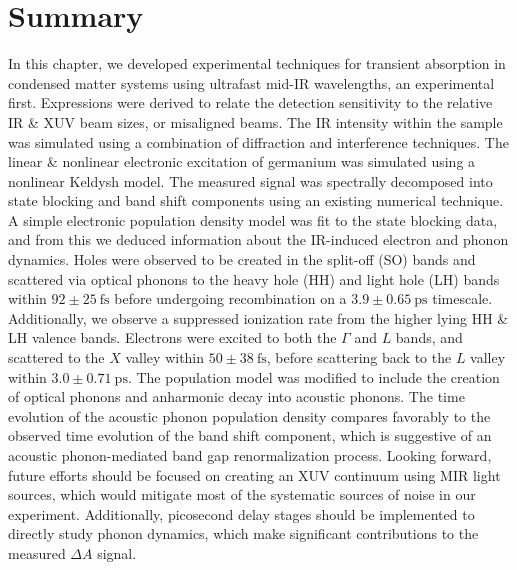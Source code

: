 \section{Summary}


In this chapter, we developed experimental techniques for transient absorption in condensed matter systems using ultrafast mid-IR wavelengths, an experimental first. Expressions were derived to relate the detection sensitivity to the relative IR \& XUV beam sizes, or misaligned beams. The IR intensity within the sample was simulated using a combination of diffraction and interference techniques. The linear \& nonlinear electronic excitation of germanium was simulated using a nonlinear Keldysh model. The measured signal was spectrally decomposed into state blocking and band shift components using an existing numerical technique. A simple electronic population density model was fit to the state blocking data, and from this we deduced information about the IR-induced electron and phonon dynamics. Holes were observed to be created in the split-off (SO) bands and scattered via optical phonons to the heavy hole (HH) and light hole (LH) bands within $92 \pm 25 \ \textrm{fs}$ before undergoing recombination on a $3.9 \pm 0.65 \ \textrm{ps}$ timescale. Additionally, we observe a suppressed ionization rate from the higher lying HH \& LH valence bands. Electrons were excited to both the $\Gamma$ and $L$ bands, and scattered to the $X$ valley within $50 \pm 38 \ \textrm{fs}$, before scattering back to the $L$ valley within $3.0 \pm 0.71 \ \textrm{ps}$. The population model was modified to include the creation of optical phonons and anharmonic decay into acoustic phonons. The time evolution of the acoustic phonon population density compares favorably to the observed time evolution of the band shift component, which is suggestive of an acoustic phonon-mediated band gap renormalization process. Looking forward, future efforts should be focused on creating an XUV continuum using MIR light sources, which would mitigate most of the systematic sources of noise in our experiment. Additionally, picosecond delay stages should be implemented to directly study phonon dynamics, which make significant contributions to the measured $\Delta A$ signal.




